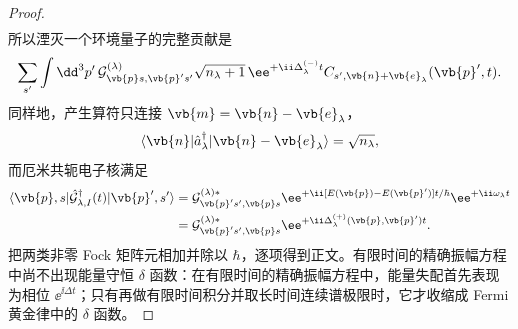 \begin{proof}
\begin{align*}
\end{align*}
所以湮灭一个环境量子的完整贡献是
\begin{equation*}
 \sum_{s'}\int\dd^3p'\,
 \mathcal G^{(\lambda)}_{\vb{p} s,\vb{p}'s'}
 \sqrt{n_\lambda+1}\,
 \ee^{+\ii\Delta_\lambda^{(-)}t}
 C_{s',\vb{n}+\vb{e}_\lambda}(\vb{p}',t).
\end{equation*}
同样地，产生算符只连接 $\vb{m}=\vb{n}-\vb{e}_\lambda$，
\begin{equation*}
 \langle\vb{n}|\hat a_\lambda^\dagger|
 \vb{n}-\vb{e}_\lambda\rangle=\sqrt{n_\lambda},
\end{equation*}
而厄米共轭电子核满足
\begin{align*}
 \langle\vb{p},s|\hat{\mathcal G}_{\lambda,I}^\dagger(t)|\vb{p}',s'\rangle
 &=\mathcal G^{(\lambda)*}_{\vb{p}'s',\vb{p} s}
 \ee^{+\ii[E(\vb{p})-E(\vb{p}')]t/\hbar}
 \ee^{+\ii\omega_\lambda t}\\
 &=\mathcal G^{(\lambda)*}_{\vb{p}'s',\vb{p} s}
 \ee^{+\ii\Delta_\lambda^{(+)}(\vb{p},\vb{p}')t}.
\end{align*}
把两类非零 Fock 矩阵元相加并除以 $\hbar$，逐项得到正文。有限时间的精确振幅方程中尚不出现能量守恒 $\delta$ 函数：在有限时间的精确振幅方程中，能量失配首先表现为相位 $\ee^{\ii\Delta t}$；只有再做有限时间积分并取长时间连续谱极限时，它才收缩成 Fermi 黄金律中的 $\delta$ 函数。
\end{proof}


